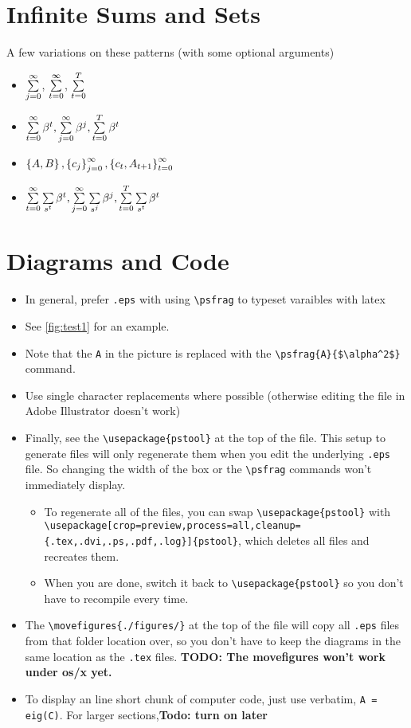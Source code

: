 \documentclass[12pt,etk-draft]{etk-article}
\begin{document}
\section{Infinite Sums and Sets}
A few variations on these patterns (with some optional arguments)
\begin{itemize}
\item $\sumlimits{j}$, $\sumlimits{t}$, $\sumlimits[T]{t}$
\item $\sumpdv{t}, \sumpdv{j}, \sumpdv[T]{t}$
\item $\set{A,B}, \setlimits{j}{c_j}, \setlimits[\infinity]{t}{c_t, A_{t+1}}$
\item $\sumpdvst{t}, \sumpdvst{j}, \sumpdvst[T]{t}$
\end{itemize}

\section{Diagrams and Code}
\begin{itemize}
\item In general, prefer \verb!.eps! with using \verb!\psfrag! to typeset varaibles with latex
\item See \cref{fig:test1} for an example.
\item Note that the \verb!A! in the picture is replaced with the \verb!\psfrag{A}{$\alpha^2$}! command.
\item Use single character replacements where possible (otherwise editing the file in Adobe Illustrator doesn't work)
\item Finally, see the \verb!\usepackage{pstool}! at the top of the file.  This setup to generate files will only regenerate them when you edit the underlying \verb!.eps! file.  So changing the width of the box or the \verb!\psfrag! commands won't immediately display.
\begin{itemize}
\item To regenerate all of the files, you can swap \verb!\usepackage{pstool}! with\\ \verb!\usepackage[crop=preview,process=all,cleanup={.tex,.dvi,.ps,.pdf,.log}]{pstool}!, which deletes all files and recreates them.
\item When you are done, switch it back to \verb!\usepackage{pstool}! so you don't have to recompile every time.
\end{itemize}
\item The \verb!\movefigures{./figures/}! at the top of the file will copy all \verb!.eps! files from that folder location over, so you don't have to keep the diagrams in the same location as the \verb!.tex! files. \textbf{TODO: The movefigures won't work under os/x yet.}
\item To display an line short chunk of computer code, just use verbatim, \verb!A = eig(C)!.  For larger sections,\textbf{Todo: turn on later}
\end{itemize}

\end{document}
